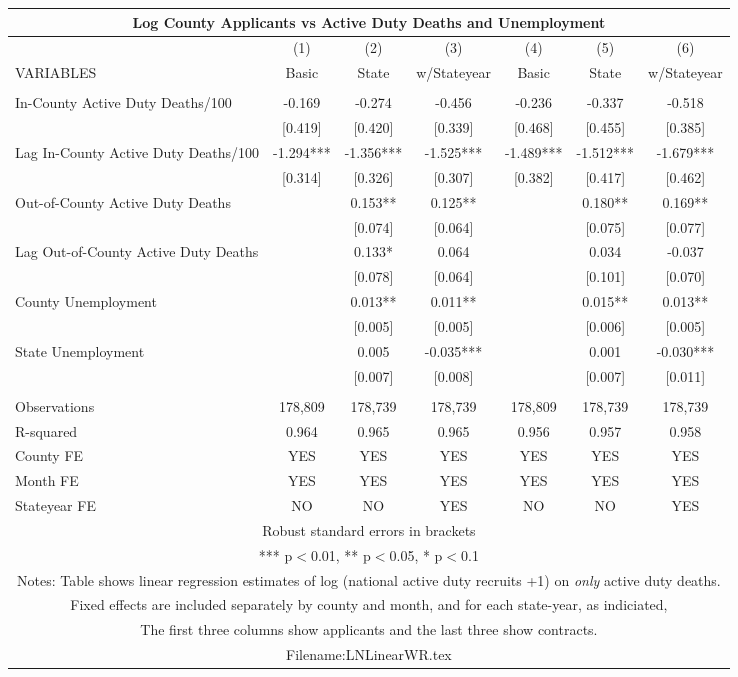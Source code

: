\documentclass[]{article}
\begin{document}
\begin{tabular}{lcccccc}
\multicolumn{7}{c}{Log County Applicants vs Active Duty Deaths and Unemployment} \\ \hline
 & (1) & (2) & (3) & (4) & (5) & (6) \\
VARIABLES & Basic & State & w/Stateyear & Basic & State & w/Stateyear \\ \hline
 &  &  &  &  &  &  \\
In-County Active Duty Deaths/100 & -0.169 & -0.274 & -0.456 & -0.236 & -0.337 & -0.518 \\
 & [0.419] & [0.420] & [0.339] & [0.468] & [0.455] & [0.385] \\
Lag In-County Active Duty Deaths/100 & -1.294*** & -1.356*** & -1.525*** & -1.489*** & -1.512*** & -1.679*** \\
 & [0.314] & [0.326] & [0.307] & [0.382] & [0.417] & [0.462] \\
Out-of-County Active Duty Deaths &  & 0.153** & 0.125** &  & 0.180** & 0.169** \\
 &  & [0.074] & [0.064] &  & [0.075] & [0.077] \\
Lag Out-of-County Active Duty Deaths &  & 0.133* & 0.064 &  & 0.034 & -0.037 \\
 &  & [0.078] & [0.064] &  & [0.101] & [0.070] \\
County Unemployment &  & 0.013** & 0.011** &  & 0.015** & 0.013** \\
 &  & [0.005] & [0.005] &  & [0.006] & [0.005] \\
State Unemployment &  & 0.005 & -0.035*** &  & 0.001 & -0.030*** \\
 &  & [0.007] & [0.008] &  & [0.007] & [0.011] \\
 &  &  &  &  &  &  \\
Observations & 178,809 & 178,739 & 178,739 & 178,809 & 178,739 & 178,739 \\
R-squared & 0.964 & 0.965 & 0.965 & 0.956 & 0.957 & 0.958 \\
County FE & YES & YES & YES & YES & YES & YES \\
Month FE & YES & YES & YES & YES & YES & YES \\
 Stateyear FE & NO & NO & YES & NO & NO & YES \\ \hline
\multicolumn{7}{c}{ Robust standard errors in brackets} \\
\multicolumn{7}{c}{ *** p$<$0.01, ** p$<$0.05, * p$<$0.1} \\
\multicolumn{7}{c}{ Notes: Table shows linear regression estimates of log (national active duty recruits +1) on \textit{only} active duty deaths.} \\
\multicolumn{7}{c}{ Fixed effects are included separately by county and month, and for each state-year, as indiciated,} \\
\multicolumn{7}{c}{ The first three columns show applicants and the last three show contracts.} \\
\multicolumn{7}{c}{ Filename:LNLinearWR.tex} \\
\end{tabular}
\end{document}
